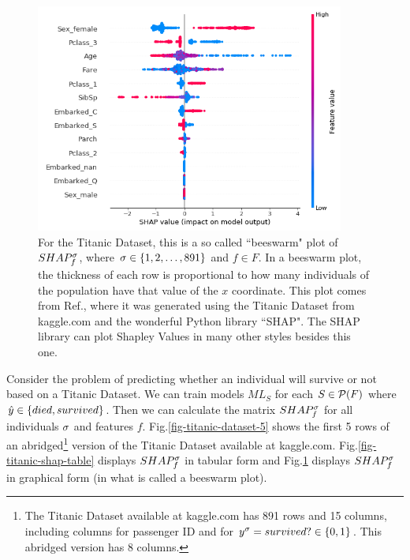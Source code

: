 \begin{enumerate}
\begin{figure}[h!]
\centering
\includegraphics[width=4in]
{shapley/titanic-shap-plot.png}
\caption{For the Titanic Dataset, 
this is a so called
``beeswarm" plot of $SHAP^\sigma_f$, where 
$\sigma\in \{1,2, \ldots, 891\}$
and $f\in F$.
In a beeswarm
plot, the thickness
of each row
is proportional to
how many 
individuals of the population
have that value 
of the $x$ coordinate.
This plot comes from 
Ref.\cite{maz-shap-titanic},
where it was generated using
the Titanic Dataset from kaggle.com and
the wonderful Python library ``SHAP".
The SHAP library can plot
Shapley Values 
in many other styles
besides this one.} 
\label{fig-titanic-shap-plot}
\end{figure}
\end{enumerate}

Consider the problem of
predicting 
whether an individual
will survive or not
based on a Titanic Dataset.
We can train models
$ML_S$ for each $S\in {\cal P}(F)$
where
${\hat{y}}\in\{died, survived\}$.
Then we can
calculate the matrix
$SHAP^\sigma_f$
for all
individuals
$\sigma$
and features $f$.
Fig.\ref{fig-titanic-dataset-5}
shows the first 5
rows
of an abridged\footnote{The Titanic Dataset 
available at kaggle.com has 
891 rows and 15 columns,
including 
columns for passenger ID and for $y^\sigma= survived?\in \{0,1\}$.
This abridged version has 8 columns.}
\label{fig-titanic-dataset-5}
version of the Titanic Dataset
available at kaggle.com.
Fig.\ref{fig-titanic-shap-table}
displays
$SHAP^\sigma_f$ in tabular
form and Fig.\ref{fig-titanic-shap-plot}
displays $SHAP^\sigma_f$
in graphical form (in 
what is called a beeswarm plot).